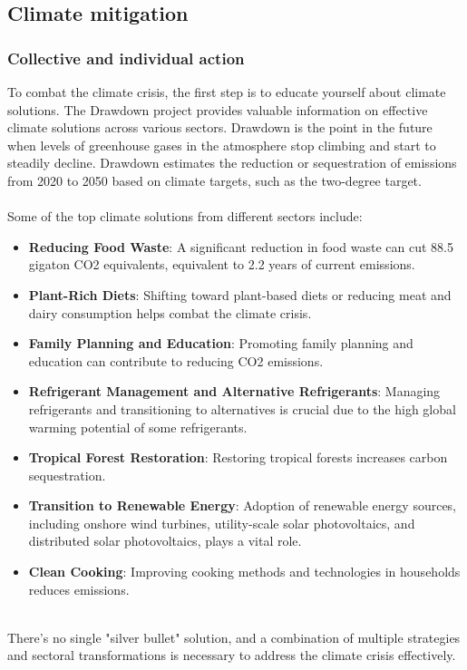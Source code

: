 \documentclass[../summary.tex]{subfiles}
\begin{document}
\subsection{Climate mitigation}

\subsubsection{Collective and individual action}

To combat the climate crisis, the first step is to educate yourself about climate solutions. The Drawdown project provides valuable information on effective climate solutions across various sectors. Drawdown is the point in the future when levels of greenhouse gases in the atmosphere stop climbing and start to steadily decline. Drawdown estimates the reduction or sequestration of emissions from 2020 to 2050 based on climate targets, such as the two-degree target.\\
\\
Some of the top climate solutions from different sectors include:

\begin{itemize}
	\item \textbf{Reducing Food Waste}: A significant reduction in food waste can cut 88.5 gigaton CO2 equivalents, equivalent to 2.2 years of current emissions.
	\item \textbf{Plant-Rich Diets}: Shifting toward plant-based diets or reducing meat and dairy consumption helps combat the climate crisis.
	\item \textbf{Family Planning and Education}: Promoting family planning and education can contribute to reducing CO2 emissions.
	\item \textbf{Refrigerant Management and Alternative Refrigerants}: Managing refrigerants and transitioning to alternatives is crucial due to the high global warming potential of some refrigerants.
	\item \textbf{Tropical Forest Restoration}: Restoring tropical forests increases carbon sequestration.
	\item \textbf{Transition to Renewable Energy}: Adoption of renewable energy sources, including onshore wind turbines, utility-scale solar photovoltaics, and distributed solar photovoltaics, plays a vital role.
	\item \textbf{Clean Cooking}: Improving cooking methods and technologies in households reduces emissions.
\end{itemize}
\ \\
There's no single "silver bullet" solution, and a combination of multiple strategies and sectoral transformations is necessary to address the climate crisis effectively.
\end{document}

